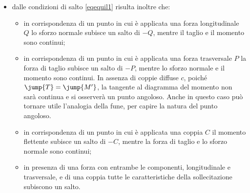 \begin{itemize}[]
\begin{itemize}
	\end{itemize}
	\item[{ b})] dalle condizioni di salto \eqref{eqequil1}
		risulta inoltre che: 
	\begin{itemize}
		\item in corrispondenza di un punto in cui è applicata una forza longitudinale $Q$ lo sforzo normale subisce un salto di $-Q$, mentre il taglio e  il momento sono continui;
		\item in corrispondenza di un punto in cui è applicata una forza trasversale $P$ la forza di taglio subisce un salto di $-P$, mentre lo sforzo normale e il momento sono continui. In assenza di coppie diffuse $c$, poiché $\jump{T}=\jump{M'}$, la tangente al diagramma del momento non sarà continua e si osserverà un punto angoloso. Anche in questo caso può tornare utile l'analogia della fune, per capire la natura del punto angoloso.
		\item in corrispondenza di un punto  in cui è applicata una coppia $C$ il momento flettente subisce un salto di $-C$,  mentre la forza di taglio e lo sforzo normale  sono continui;
		\item in presenza di una forza con entrambe  le componenti, longitudinale e trasversale, e di una coppia tutte le caratteristiche della sollecitazione subiscono un salto.
	\end{itemize}
\end{itemize}


